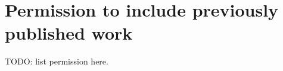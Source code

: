 \chapter{Permission to include previously published work}
\label{ch:permission}

TODO: list permission here.
